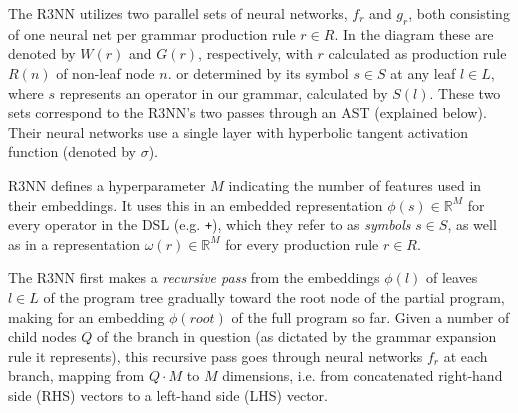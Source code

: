 \documentclass{article} %
\begin{document}

The R3NN utilizes two parallel sets of neural networks, $f_r$ and $g_r$,
both consisting of one neural net per grammar production rule $r \in R$.
In the diagram these are denoted by $W(r)$ and $G(r)$, respectively,
with $r$ calculated as production rule $R(n)$ of non-leaf node $n$.
or determined by its symbol $s \in S$ at any leaf $l \in L$,
where $s$ represents an operator in our grammar, calculated by $S(l)$.
These two sets correspond to the R3NN's two passes through an AST (explained below).
Their neural networks use a single layer with hyperbolic tangent activation function (denoted by $\sigma$).

R3NN defines a hyperparameter $M$ indicating the number of features used in their embeddings.
It uses this in an embedded representation $\phi(s) \in \mathbb{R}^M$
for every operator in the DSL (e.g. \verb|+|), which they refer to as \emph{symbols} $s \in S$,
as well as in a representation $\omega(r) \in \mathbb{R}^M$ for every production rule $r \in R$.

The R3NN first makes a \emph{recursive pass} from the embeddings $\phi(l)$
of leaves $l \in L$ of the program tree gradually toward the root node of the partial program,
making for an embedding $\phi(root)$ of the full program so far.
Given a number of child nodes $Q$ of the branch in question
(as dictated by the grammar expansion rule it represents),
this recursive pass goes through neural networks $f_r$ at each branch,
mapping from $Q \cdot M$ to $M$ dimensions,
i.e. from concatenated right-hand side (RHS) vectors to a left-hand side (LHS) vector.
\end{document}
